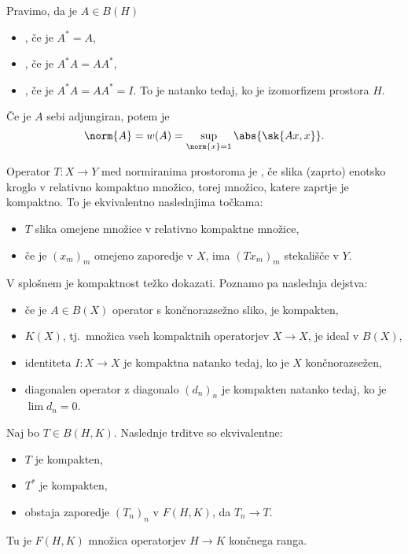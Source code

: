 Pravimo, da je $A \in B(H)$
\begin{itemize}
\item {}, če je $A^* = A$,
\item {}, če je $A^* A = A A^*$,
\item {}, če je $A^* A = A A^* = I$.
  To je natanko tedaj, ko je izomorfizem prostora $H$.
\end{itemize}

Če je $A$ sebi adjungiran, potem je
\[
  \norm{A} = w(A) = \sup_{\norm{x} = 1} \abs{\sk{Ax,x}}.
\]


Operator $T: X \to Y$ med normiranima prostoroma je , če slika
(zaprto) enotsko kroglo v relativno kompaktno množico, torej množico, katere
zaprtje je kompaktno.
To je ekvivalentno naslednjima točkama:
\begin{itemize}
\item $T$ slika omejene množice v relativno kompaktne množice,
\item če je $(x_m)_m$ omejeno zaporedje v $X$, ima $(Tx_m)_m$ stekališče v $Y$.
\end{itemize}
V splošnem je kompaktnost težko dokazati.
Poznamo pa naslednja dejstva:
\begin{itemize}
\item če je $A \in B(X)$ operator s končnorazsežno sliko, je kompakten,
\item $K(X)$, tj.~množica vseh kompaktnih operatorjev $X \to X$, je ideal v
  $B(X)$,
\item identiteta $I: X \to X$ je kompaktna natanko tedaj, ko je $X$
  končnorazsežen,
\item diagonalen operator z diagonalo $(d_n)_n$ je kompakten natanko tedaj, ko
  je $\lim d_n = 0$.
\end{itemize}

\begin{izrek}
  Naj bo $T \in B(H,K)$.
  Naslednje trditve so ekvivalentne:
  \begin{itemize}
  \item $T$ je kompakten,
  \item $T^*$ je kompakten,
  \item obstaja zaporedje $(T_n)_n$ v $F(H,K)$, da $T_n \to T$.
  \end{itemize}
\end{izrek}
Tu je $F(H,K)$ množica operatorjev $H \to K$ končnega ranga.

